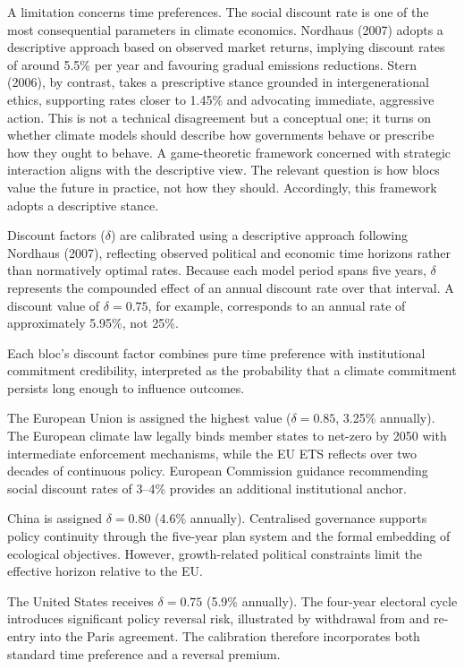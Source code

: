 \documentclass[12pt,a4paper]{article}
\begin{document}
A limitation concerns time preferences. The social discount rate is one of the most consequential parameters in climate economics. Nordhaus (2007) adopts a descriptive approach based on observed market returns, implying discount rates of around 5.5\% per year and favouring gradual emissions reductions. Stern (2006), by contrast, takes a prescriptive stance grounded in intergenerational ethics, supporting rates closer to 1.45\% and advocating immediate, aggressive action. This is not a technical disagreement but a conceptual one; it turns on whether climate models should describe how governments behave or prescribe how they ought to behave. A game-theoretic framework concerned with strategic interaction aligns with the descriptive view. The relevant question is how blocs value the future in practice, not how they should. Accordingly, this framework adopts a descriptive stance.

Discount factors ($\delta$) are calibrated using a descriptive approach following Nordhaus (2007), reflecting observed political and economic time horizons rather than normatively optimal rates. Because each model period spans five years, $\delta$ represents the compounded effect of an annual discount rate over that interval. A discount value of $\delta = 0.75$, for example, corresponds to an annual rate of approximately 5.95\%, not 25\%.

Each bloc's discount factor combines pure time preference with institutional commitment credibility, interpreted as the probability that a climate commitment persists long enough to influence outcomes.

The European Union is assigned the highest value ($\delta = 0.85$, 3.25\% annually). The European climate law legally binds member states to net-zero by 2050 with intermediate enforcement mechanisms, while the EU ETS reflects over two decades of continuous policy. European Commission guidance recommending social discount rates of 3--4\% provides an additional institutional anchor.

China is assigned $\delta = 0.80$ (4.6\% annually). Centralised governance supports policy continuity through the five-year plan system and the formal embedding of ecological objectives. However, growth-related political constraints limit the effective horizon relative to the EU.

The United States receives $\delta = 0.75$ (5.9\% annually). The four-year electoral cycle introduces significant policy reversal risk, illustrated by withdrawal from and re-entry into the Paris agreement. The calibration therefore incorporates both standard time preference and a reversal premium.
\end{document}
